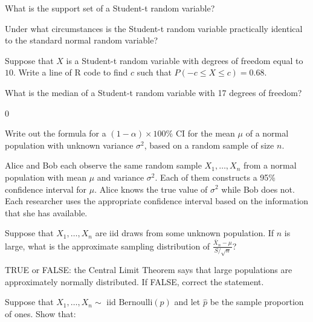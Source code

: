 \documentclass[addpoints,12pt]{exam}
\begin{document}
\begin{questions}
  \question What is the support set of a Student-t random variable?

  \question Under what circumstances is the Student-t random variable practically identical to the standard normal random variable?

  \question Suppose that $X$ is a Student-t random variable with degrees of freedom equal to $10$. Write a line of R code to find $c$ such that $P(-c \leq X \leq c) = 0.68$. 

  \question What is the median of a Student-t random variable with 17 degrees of freedom?
  \begin{solution}
    0
  \end{solution}

  \question Write out the formula for a $(1 - \alpha) \times 100\%$ CI for the mean $\mu$ of a normal population with unknown variance $\sigma^2$, based on a random sample of size $n$.

  \question Alice and Bob each observe the same random sample $X_1, \dots, X_n$ from a normal population with mean $\mu$ and variance $\sigma^2$.
  Each of them constructs a 95\% confidence interval for $\mu$.
  Alice knows the true value of $\sigma^2$ while Bob does not.
  Each researcher uses the appropriate confidence interval based on the information that she has available. 

  \question Suppose that $X_1, \dots, X_n$ are iid draws from some unknown population. If $n$ is large, what is the approximate sampling distribution of $\frac{\bar{X}_n - \mu}{S/\sqrt{n}}$?

\question TRUE or FALSE: the Central Limit Theorem says that large populations are approximately normally distributed. If FALSE, correct the statement.

\question Suppose that $X_1, \dots, X_n \sim \mbox { iid Bernoulli}(p)$ and let $\widehat{p}$ be the sample proportion of ones. Show that:
\end{questions}
\end{document}
